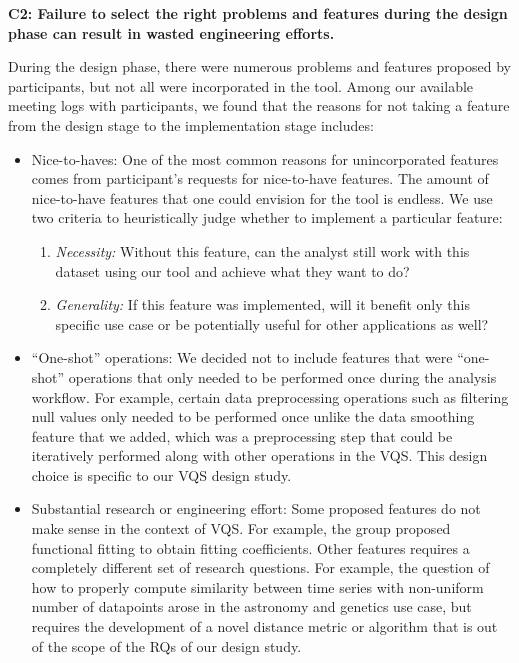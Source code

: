{%
\par \textbf{C2: Failure to select the right problems and features during the design phase can result in wasted engineering efforts.}

\par During the design phase, there were numerous problems and features proposed by participants, but not all were incorporated in the tool. Among our available meeting logs with participants, we found that the reasons for not taking a feature from the design stage to the implementation stage includes: 
\begin{itemize}
\item Nice-to-haves: One of the most common reasons for unincorporated features comes from participant's requests for nice-to-have features. The amount of nice-to-have features that one could envision for the tool is endless. We use 
two criteria to heuristically judge whether to implement a particular feature:
\begin{enumerate}
\item \textit{Necessity:} Without this feature, can the analyst still work with this dataset using our tool and achieve what they want to do? 
\item \textit{Generality:} If this feature was implemented, will it benefit only this specific use case or be potentially useful for other applications as well?
\end{enumerate}
\item ``One-shot'' operations: We decided not to include features that were ``one-shot'' operations that only needed to be performed once during the analysis workflow. For example, certain data preprocessing operations such as filtering null values only needed to be performed once unlike the data smoothing feature that we added, which was a preprocessing step that could be iteratively performed along with other operations in the VQS. This design choice is specific to our VQS design study.
\item Substantial research or engineering effort: Some proposed features do not make sense in the context of VQS. For example, the \matsci group proposed functional fitting to obtain fitting coefficients. Other features requires a completely different set of research questions. For example, the question of how to properly compute similarity between time series with non-uniform number of datapoints arose in the astronomy and genetics use case, but requires the development of a novel distance metric or algorithm that is out of the scope of the RQs of our design study.

\end{itemize}}
